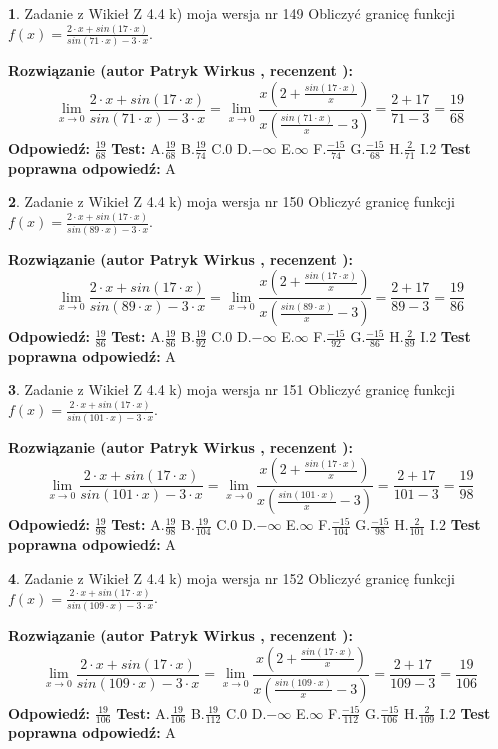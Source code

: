 \documentclass[12pt, a4paper]{article}
\theoremstyle{definition} %
\newtheorem{zad}{}
\newcommand{\zadStart}[1]{\begin{zad}#1\newline}
\newcommand{\zadStop}{\end{zad}}
\newcommand{\rozwStart}[2]{\noindent \textbf{Rozwiązanie (autor #1 , recenzent #2): }\newline}
\newcommand{\rozwStop}{\newline}
\newcommand{\odpStart}{\noindent \textbf{Odpowiedź:}\newline}
\newcommand{\odpStop}{\newline}
\newcommand{\testStart}{\noindent \textbf{Test:}\newline}
\newcommand{\testStop}{\newline}
\newcommand{\kluczStart}{\noindent \textbf{Test poprawna odpowiedź:}\newline}
\newcommand{\kluczStop}{\newline}
\begin{document}
\zadStart{Zadanie z Wikieł Z 4.4 k) moja wersja nr 149}
Obliczyć granicę funkcji $f(x)=\frac{2\cdot x +sin(17\cdot x)}{sin(71\cdot x) -3\cdot x}$.
\zadStop
\rozwStart{Patryk Wirkus}{}
$$\lim\limits_{x\to 0}\frac{2\cdot x +sin(17\cdot x)}{sin(71\cdot x) -3\cdot x}
=\lim\limits_{x\to 0}\frac{x(2+\frac{sin(17\cdot x)}{x})}{x(\frac{sin(71\cdot x)}{x}-3)}
=\frac{2+17}{71-3} = \frac{19}{68}$$
\rozwStop
\odpStart
$\frac{19}{68}$
\odpStop
\testStart
A.$\frac{19}{68}$
B.$\frac{19}{74}$
C.$0$
D.$-\infty$
E.$\infty$
F.$\frac{-15}{74}$
G.$\frac{-15}{68}$
H.$\frac{2}{71}$
I.$2$
\testStop
\kluczStart
A
\kluczStop



\zadStart{Zadanie z Wikieł Z 4.4 k) moja wersja nr 150}
Obliczyć granicę funkcji $f(x)=\frac{2\cdot x +sin(17\cdot x)}{sin(89\cdot x) -3\cdot x}$.
\zadStop
\rozwStart{Patryk Wirkus}{}
$$\lim\limits_{x\to 0}\frac{2\cdot x +sin(17\cdot x)}{sin(89\cdot x) -3\cdot x}
=\lim\limits_{x\to 0}\frac{x(2+\frac{sin(17\cdot x)}{x})}{x(\frac{sin(89\cdot x)}{x}-3)}
=\frac{2+17}{89-3} = \frac{19}{86}$$
\rozwStop
\odpStart
$\frac{19}{86}$
\odpStop
\testStart
A.$\frac{19}{86}$
B.$\frac{19}{92}$
C.$0$
D.$-\infty$
E.$\infty$
F.$\frac{-15}{92}$
G.$\frac{-15}{86}$
H.$\frac{2}{89}$
I.$2$
\testStop
\kluczStart
A
\kluczStop



\zadStart{Zadanie z Wikieł Z 4.4 k) moja wersja nr 151}
Obliczyć granicę funkcji $f(x)=\frac{2\cdot x +sin(17\cdot x)}{sin(101\cdot x) -3\cdot x}$.
\zadStop
\rozwStart{Patryk Wirkus}{}
$$\lim\limits_{x\to 0}\frac{2\cdot x +sin(17\cdot x)}{sin(101\cdot x) -3\cdot x}
=\lim\limits_{x\to 0}\frac{x(2+\frac{sin(17\cdot x)}{x})}{x(\frac{sin(101\cdot x)}{x}-3)}
=\frac{2+17}{101-3} = \frac{19}{98}$$
\rozwStop
\odpStart
$\frac{19}{98}$
\odpStop
\testStart
A.$\frac{19}{98}$
B.$\frac{19}{104}$
C.$0$
D.$-\infty$
E.$\infty$
F.$\frac{-15}{104}$
G.$\frac{-15}{98}$
H.$\frac{2}{101}$
I.$2$
\testStop
\kluczStart
A
\kluczStop



\zadStart{Zadanie z Wikieł Z 4.4 k) moja wersja nr 152}
Obliczyć granicę funkcji $f(x)=\frac{2\cdot x +sin(17\cdot x)}{sin(109\cdot x) -3\cdot x}$.
\zadStop
\rozwStart{Patryk Wirkus}{}
$$\lim\limits_{x\to 0}\frac{2\cdot x +sin(17\cdot x)}{sin(109\cdot x) -3\cdot x}
=\lim\limits_{x\to 0}\frac{x(2+\frac{sin(17\cdot x)}{x})}{x(\frac{sin(109\cdot x)}{x}-3)}
=\frac{2+17}{109-3} = \frac{19}{106}$$
\rozwStop
\odpStart
$\frac{19}{106}$
\odpStop
\testStart
A.$\frac{19}{106}$
B.$\frac{19}{112}$
C.$0$
D.$-\infty$
E.$\infty$
F.$\frac{-15}{112}$
G.$\frac{-15}{106}$
H.$\frac{2}{109}$
I.$2$
\testStop
\kluczStart
A
\kluczStop
\end{document}
